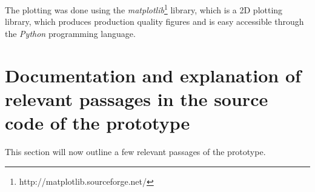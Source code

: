 The plotting was done using the
\textit{matplotlib}\footnote{http://matplotlib.sourceforge.net/} library, which
is a 2D plotting library, which produces production quality figures and is easy
accessible through the \textit{Python} programming language.

\section{Documentation and explanation of relevant passages in the source code of the prototype}

This section will now outline a few relevant passages of the prototype.
